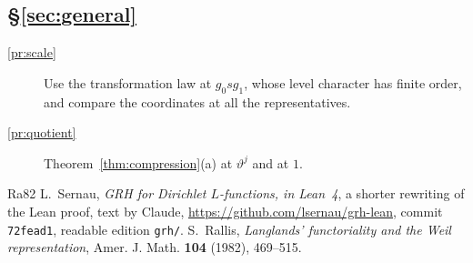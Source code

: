 \documentclass[reqno]{amsart}
\theoremstyle{definition}
\theoremstyle{plain}
\theoremstyle{remark}
\begin{document}
\subsection*{\S\ref{sec:general}}
\begin{description}
\item[\ref{pr:scale}] Use the transformation law at \(g_0 s g_1\), whose level character has finite order, and compare the coordinates at all the representatives.
\item[\ref{pr:quotient}] Theorem~\ref{thm:compression}(a) at \(\vartheta^j\) and at \(1\).
\end{description}

{\small
\begin{thebibliography}{Ra82}
 L.~Sernau, \emph{GRH for Dirichlet \(L\)-functions, in Lean~4}, a shorter rewriting of the Lean proof, text by Claude, \url{https://github.com/lsernau/grh-lean}, commit \texttt{72fead1}, readable edition \texttt{grh/}.
 S.~Rallis, \emph{Langlands' functoriality and the Weil representation}, Amer. J. Math. \textbf{104} (1982), 469--515.
\end{thebibliography}
}
\end{document}
